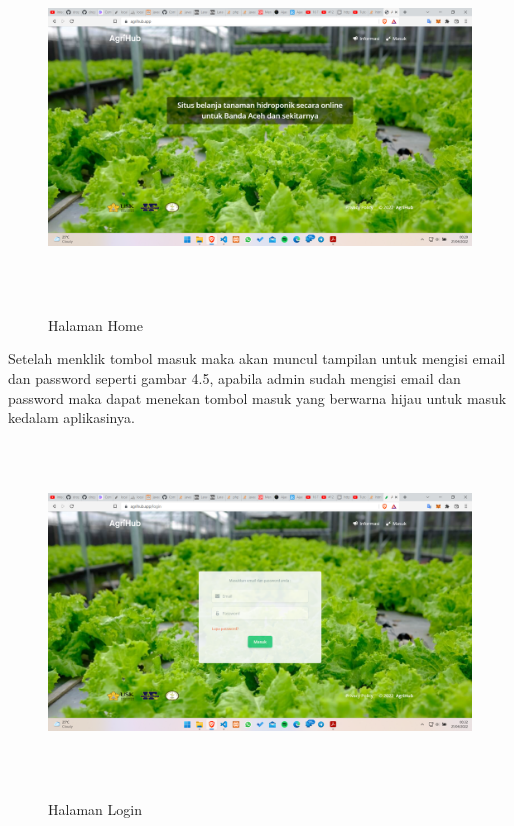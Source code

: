 \begin{enumerate}
\begin{enumerate}
			\begin{figure}[H]
				\centering
				{\includegraphics [width = 14.3cm, height= 9cm]{gambar/homepage}}
				\caption{Halaman Home}
				\label{homepage}
			\end{figure}

			\par Setelah menklik tombol masuk maka akan muncul tampilan untuk mengisi email dan password seperti gambar 4.5, apabila admin sudah mengisi email dan password maka dapat menekan tombol masuk yang berwarna hijau untuk masuk kedalam aplikasinya.

			\begin{figure}[H]
				\centering
				{\includegraphics [width = 14.3cm, height= 9cm]{gambar/login}}
				\caption{Halaman Login}
				\label{login}
			\end{figure}


\end{enumerate}
\end{enumerate}
